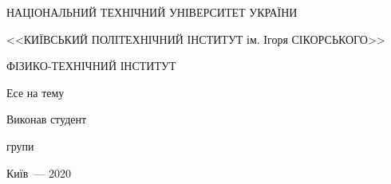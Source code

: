 \thispagestyle{empty}

\begin{center}
НАЦІОНАЛЬНИЙ ТЕХНІЧНИЙ УНІВЕРСИТЕТ УКРАЇНИ \par
<<КИЇВСЬКИЙ ПОЛІТЕХНІЧНИЙ ІНСТИТУТ ім. Ігоря СІКОРСЬКОГО>>\par
ФІЗИКО-ТЕХНІЧНИЙ ІНСТИТУТ\par

\vspace{40mm}
{\huge Есе на тему \par}

\huge\MakeUppercase{\textbf{\reportTitle}} \par
\end{center}

\vspace{40mm}
\begin{flushright}
Виконав студент

групи \reportAuthorGroup

\reportAuthor

\vspace{20mm}



\end{flushright}

\vspace{20mm}
\begin{center}
{Київ~--- 2020}
\end{center}

\newpage
